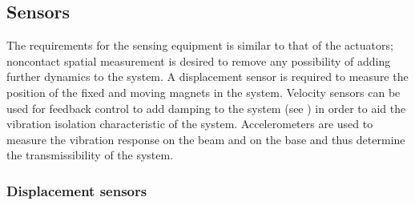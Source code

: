 \documentclass[11pt,a4paper]{memoir}
\begin{document}
\subsection{Sensors}

The requirements for the sensing equipment is similar to that of the actuators; noncontact spatial measurement is desired to remove any possibility of adding further dynamics to the system.
A displacement sensor is required to measure the position of the fixed and moving magnets in the system.
Velocity sensors can be used for feedback control to add damping to the system (see ) in order to aid the vibration isolation characteristic of the system.
Accelerometers are used to measure the vibration response on the beam and on the base and thus determine the transmissibility of the system.

\subsubsection{Displacement sensors}
\end{document}
